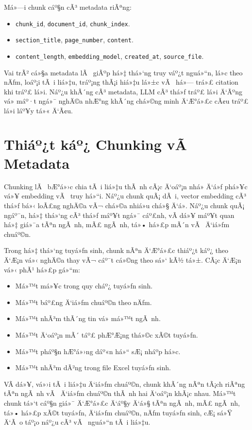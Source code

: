 ﻿\documentclass[12pt,a4paper]{report}
\begin{document}
Má»—i chunk cáº§n cÃ³ metadata riÃªng:

\begin{itemize}
    \item \texttt{chunk\_id}, \texttt{document\_id}, \texttt{chunk\_index}.
    \item \texttt{section\_title}, \texttt{page\_number}, \texttt{content}.
    \item \texttt{content\_length}, \texttt{embedding\_model}, \texttt{created\_at}, \texttt{source\_file}.
\end{itemize}

Vai trÃ² cá»§a metadata lÃ  giÃºp há»‡ thá»‘ng truy váº¿t nguá»“n, lá»c theo nÄƒm, loáº¡i tÃ i liá»‡u, tráº¡ng thÃ¡i hiá»‡u lá»±c vÃ  há»— trá»£ citation khi tráº£ lá»i. Náº¿u khÃ´ng cÃ³ metadata, LLM cÃ³ thá»ƒ tráº£ lá»i Ä‘Ãºng vá» máº·t ngá»¯ nghÄ©a nhÆ°ng khÃ´ng chá»©ng minh Ä‘Æ°á»£c cÃ¢u tráº£ lá»i láº¥y tá»« Ä‘Ã¢u.

\section{Thiáº¿t káº¿ Chunking vÃ  Metadata}

Chunking lÃ  bÆ°á»›c chia tÃ i liá»‡u thÃ nh cÃ¡c Ä‘oáº¡n nhá» Ä‘á»ƒ phá»¥c vá»¥ embedding vÃ  truy há»“i. Náº¿u chunk quÃ¡ dÃ i, vector embedding cÃ³ thá»ƒ bá»‹ loÃ£ng nghÄ©a vÃ¬ chá»©a nhiá»u chá»§ Ä‘á». Náº¿u chunk quÃ¡ ngáº¯n, há»‡ thá»‘ng cÃ³ thá»ƒ máº¥t ngá»¯ cáº£nh, vÃ­ dá»¥ máº¥t quan há»‡ giá»¯a tÃªn ngÃ nh, mÃ£ ngÃ nh, tá»• há»£p mÃ´n vÃ  Ä‘iá»ƒm chuáº©n.

Trong há»‡ thá»‘ng tuyá»ƒn sinh, chunk nÃªn Ä‘Æ°á»£c thiáº¿t káº¿ theo Ä‘Æ¡n vá»‹ nghÄ©a thay vÃ¬ cáº¯t cá»©ng theo sá»‘ kÃ½ tá»±. CÃ¡c Ä‘Æ¡n vá»‹ phÃ¹ há»£p gá»“m:

\begin{itemize}
    \item Má»™t má»¥c trong quy cháº¿ tuyá»ƒn sinh.
    \item Má»™t báº£ng Ä‘iá»ƒm chuáº©n theo nÄƒm.
    \item Má»™t nhÃ³m thÃ´ng tin vá» má»™t ngÃ nh.
    \item Má»™t Ä‘oáº¡n mÃ´ táº£ phÆ°Æ¡ng thá»©c xÃ©t tuyá»ƒn.
    \item Má»™t pháº§n hÆ°á»›ng dáº«n há»“ sÆ¡ nháº­p há»c.
    \item Má»™t nhÃ³m dÃ²ng trong file Excel tuyá»ƒn sinh.
\end{itemize}

VÃ­ dá»¥, vá»›i tÃ i liá»‡u Ä‘iá»ƒm chuáº©n, chunk khÃ´ng nÃªn tÃ¡ch riÃªng tÃªn ngÃ nh vÃ  Ä‘iá»ƒm chuáº©n thÃ nh hai Ä‘oáº¡n khÃ¡c nhau. Má»™t chunk tá»‘t cáº§n giá»¯ Ä‘Æ°á»£c Ä‘áº§y Ä‘á»§ tÃªn ngÃ nh, mÃ£ ngÃ nh, tá»• há»£p xÃ©t tuyá»ƒn, Ä‘iá»ƒm chuáº©n, nÄƒm tuyá»ƒn sinh, cÆ¡ sá»Ÿ Ä‘Ã o táº¡o náº¿u cÃ³ vÃ  nguá»“n tÃ i liá»‡u.
\end{document}
